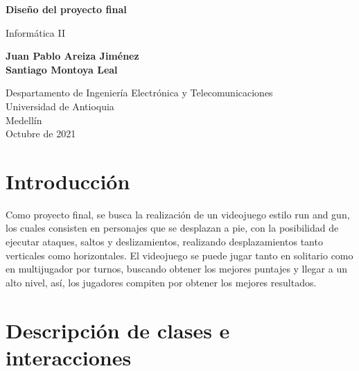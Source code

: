 \documentclass{article}
\begin{document}
\begin{titlepage}
    \begin{center}
        \vspace*{1cm}
            
        \Huge
        \textbf{Diseño del proyecto final}
            
        \vspace{0.5cm}
        \LARGE
        Informática II
            
        \vspace{1.5cm}
            
        \textbf{Juan Pablo Areiza Jiménez\\Santiago Montoya Leal}
            
        \vfill
            
        \vspace{0.8cm}
            
        \Large
        Despartamento de Ingeniería Electrónica y Telecomunicaciones\\
        Universidad de Antioquia\\
        Medellín\\
        Octubre de 2021
            
    \end{center}
\end{titlepage}

\tableofcontents
\newpage

\section{Introducción}

Como proyecto final, se busca la realización de un videojuego estilo run and gun, los cuales consisten en personajes que se desplazan a pie, con la posibilidad de ejecutar ataques, saltos y deslizamientos, realizando desplazamientos tanto verticales como horizontales. El videojuego se puede jugar tanto en solitario como en multijugador por turnos, buscando obtener los mejores puntajes y llegar a un alto nivel, así, los jugadores compiten por obtener los mejores resultados. 

\section{Descripción de clases e interacciones}
\end{document}
